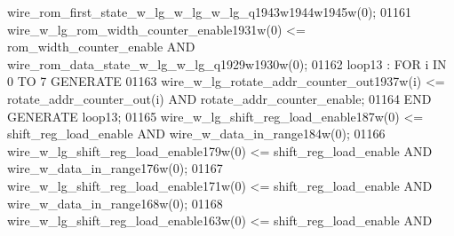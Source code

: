\begin{DoxyCode}
{{      wire_rom_first_state_w_lg_w_lg_w_lg_q1943w1944w1945w}\textcolor{vhdlchar}{(}\textcolor{vhdllogic}{}\textcolor{vhdllogic}{0}\textcolor{vhdlchar}{)};
01161     \textcolor{vhdlchar}{wire_w_lg_rom_width_counter_enable1931w}\textcolor{vhdlchar}{(}\textcolor{vhdllogic}{}\textcolor{vhdllogic}{0}\textcolor{vhdlchar}{)} \textcolor{vhdlchar}{<=} \textcolor{vhdlchar}{rom_width_counter_enable} \textcolor{keywordflow}{AND} \textcolor{vhdlchar}{
      wire_rom_data_state_w_lg_w_lg_q1929w1930w}\textcolor{vhdlchar}{(}\textcolor{vhdllogic}{}\textcolor{vhdllogic}{0}\textcolor{vhdlchar}{)};
01162     \textcolor{vhdlchar}{loop13} \textcolor{vhdlchar}{:} \textcolor{keywordflow}{FOR} \textcolor{vhdlchar}{i} \textcolor{keywordflow}{IN} \textcolor{vhdllogic}{}\textcolor{vhdllogic}{0} \textcolor{keywordflow}{TO} \textcolor{vhdllogic}{}\textcolor{vhdllogic}{7} \textcolor{keywordflow}{GENERATE} 
01163         \textcolor{vhdlchar}{wire_w_lg_rotate_addr_counter_out1937w}\textcolor{vhdlchar}{(}\textcolor{vhdlchar}{i}\textcolor{vhdlchar}{)} \textcolor{vhdlchar}{<=} \textcolor{vhdlchar}{rotate_addr_counter_out}\textcolor{vhdlchar}{(}\textcolor{vhdlchar}{i}\textcolor{vhdlchar}{)} \textcolor{keywordflow}{AND} \textcolor{vhdlchar}{
      rotate_addr_counter_enable};
01164     \textcolor{keywordflow}{END} \textcolor{keywordflow}{GENERATE} \textcolor{vhdlchar}{loop13};
01165     \textcolor{vhdlchar}{wire_w_lg_shift_reg_load_enable187w}\textcolor{vhdlchar}{(}\textcolor{vhdllogic}{}\textcolor{vhdllogic}{0}\textcolor{vhdlchar}{)} \textcolor{vhdlchar}{<=} \textcolor{vhdlchar}{shift_reg_load_enable} \textcolor{keywordflow}{AND} \textcolor{vhdlchar}{
      wire_w_data_in_range184w}\textcolor{vhdlchar}{(}\textcolor{vhdllogic}{}\textcolor{vhdllogic}{0}\textcolor{vhdlchar}{)};
01166     \textcolor{vhdlchar}{wire_w_lg_shift_reg_load_enable179w}\textcolor{vhdlchar}{(}\textcolor{vhdllogic}{}\textcolor{vhdllogic}{0}\textcolor{vhdlchar}{)} \textcolor{vhdlchar}{<=} \textcolor{vhdlchar}{shift_reg_load_enable} \textcolor{keywordflow}{AND} \textcolor{vhdlchar}{
      wire_w_data_in_range176w}\textcolor{vhdlchar}{(}\textcolor{vhdllogic}{}\textcolor{vhdllogic}{0}\textcolor{vhdlchar}{)};
01167     \textcolor{vhdlchar}{wire_w_lg_shift_reg_load_enable171w}\textcolor{vhdlchar}{(}\textcolor{vhdllogic}{}\textcolor{vhdllogic}{0}\textcolor{vhdlchar}{)} \textcolor{vhdlchar}{<=} \textcolor{vhdlchar}{shift_reg_load_enable} \textcolor{keywordflow}{AND} \textcolor{vhdlchar}{
      wire_w_data_in_range168w}\textcolor{vhdlchar}{(}\textcolor{vhdllogic}{}\textcolor{vhdllogic}{0}\textcolor{vhdlchar}{)};
01168     \textcolor{vhdlchar}{wire_w_lg_shift_reg_load_enable163w}\textcolor{vhdlchar}{(}\textcolor{vhdllogic}{}\textcolor{vhdllogic}{0}\textcolor{vhdlchar}{)} \textcolor{vhdlchar}{<=} \textcolor{vhdlchar}{shift_reg_load_enable} \textcolor{keywordflow}{AND} \textcolor{vhdlchar}{
}}
\end{DoxyCode}
